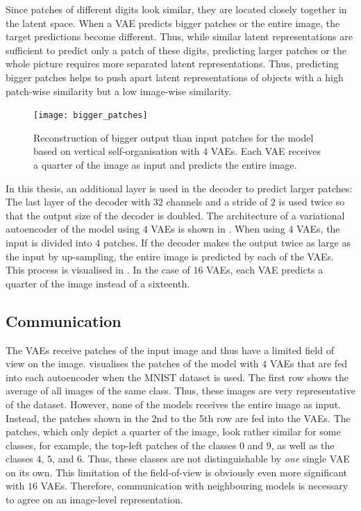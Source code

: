 Since patches of different digits look similar, they are located closely together in the latent space.
When a VAE predicts bigger patches or the entire image, the target predictions become different. Thus, while similar latent representations are sufficient to predict only a patch of these digits, predicting larger patches or the whole picture requires more separated latent representations.
Thus, predicting bigger patches helps to push apart latent representations of objects with a high patch-wise similarity but a low image-wise similarity.

\begin{figure}[h]
    \centering
    \texttt{[image: bigger\_patches]}
    \caption[Reconstruction of bigger output than input patches]{Reconstruction of bigger output than input patches for the model based on vertical self-organisation with $4$ VAEs. Each VAE receives a quarter of the image as input and predicts the entire image.}
\end{figure}

In this thesis, an additional layer is used in the decoder to predict larger patches: The last layer of the decoder with $32$ channels and a stride of $2$ is used twice so that the output size of the decoder is doubled. The architecture of a variational autoencoder of the model using $4$ VAEs is shown in .
When using $4$ VAEs, the input is divided into $4$ patches. If the decoder makes the output twice as large as the input by up-sampling, the entire image is predicted by each of the VAEs. This process is visualised in .
In the case of $16$ VAEs, each VAE predicts a quarter of the image instead of a sixteenth.


\subsection{Communication}
The VAEs receive patches of the input image and thus have a limited field of view on the image.
 visualises the patches of the model with $4$ VAEs that are fed into each autoencoder when the MNIST dataset \cite{Lecun_Bottou_Bengio_Haffner_1998} is used.
The first row shows the average of all images of the same class. Thus, these images are very representative of the dataset.
However, none of the models receives the entire image as input. Instead, the patches shown in the 2nd to the 5th row are fed into the VAEs.
The patches, which only depict a quarter of the image, look rather similar for some classes, for example, the top-left patches of the classes $0$ and $9$, as well as the classes $4$, $5$, and $6$.
Thus, these classes are not distinguishable by \emph{one} single VAE on its own.
This limitation of the field-of-view is obviously even more significant with $16$ VAEs.
Therefore, communication with neighbouring models is necessary to agree on an image-level representation.


